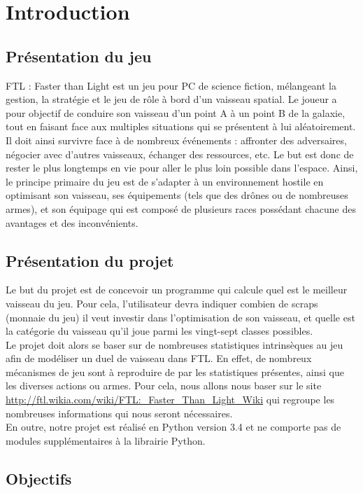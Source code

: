 	\chapter{Introduction}
	
	\section{Présentation du jeu}
	
	FTL : Faster than Light est un jeu pour PC de science fiction, mélangeant la gestion, la stratégie et le jeu de rôle à bord d'un vaisseau spatial. Le joueur a pour objectif de conduire son vaisseau d'un point A à un point B de la galaxie, tout en faisant face aux multiples situations qui se présentent à lui aléatoirement. Il doit ainsi survivre face à de nombreux événements : affronter des adversaires, négocier avec d'autres vaisseaux, échanger des ressources, etc. Le but est donc de rester le plus longtemps en vie pour aller le plus loin possible dans l'espace. Ainsi, le principe primaire du jeu est de s'adapter à un environnement hostile en optimisant son vaisseau, ses équipements (tels que des drônes ou de nombreuses armes), et son équipage qui est composé de plusieurs races possédant chacune des avantages et des inconvénients.
		
	\section{Présentation du projet}
	
Le but du projet est de concevoir un programme qui calcule quel est le meilleur vaisseau du jeu. Pour cela, l'utilisateur devra indiquer combien de scraps (monnaie du jeu) il veut investir dans l'optimisation de son vaisseau, et quelle est la catégorie du vaisseau qu'il joue parmi les vingt-sept classes possibles.
\\
Le projet doit alors se baser sur de nombreuses statistiques intrinsèques au jeu afin de modéliser un duel de vaisseau dans FTL. En effet, de nombreux mécanismes de jeu sont à reproduire de par les statistiques présentes, ainsi que les diverses actions ou armes. Pour cela, nous allons nous baser sur le site \url {http://ftl.wikia.com/wiki/FTL:_Faster_Than_Light_Wiki} qui regroupe les nombreuses informations qui nous seront nécessaires.
\\
En outre, notre projet est réalisé en Python version 3.4 et ne comporte pas de modules supplémentaires à la librairie Python.

	\section{Objectifs}
	

